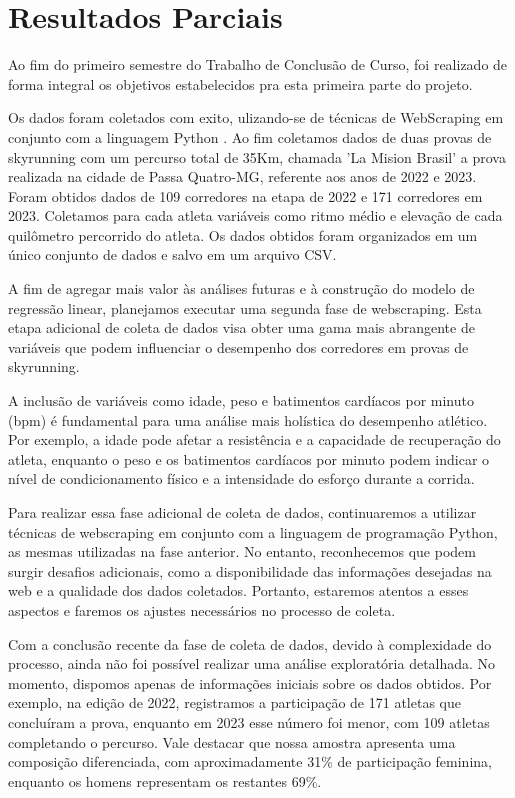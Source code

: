 \section{Resultados Parciais}

Ao fim do primeiro semestre do Trabalho de Conclusão de Curso, foi realizado de forma integral os objetivos estabelecidos pra esta primeira parte do projeto.

Os dados foram coletados com exito, ulizando-se de técnicas de WebScraping em conjunto com a linguagem Python \cite{mitchell2019}. Ao fim coletamos dados de duas provas de skyrunning com um percurso total de 35Km, chamada 'La Mision Brasil' a prova realizada na cidade de Passa Quatro-MG, referente aos anos de 2022 e 2023. Foram obtidos dados de 109 corredores na etapa de 2022 e 171 corredores em 2023. Coletamos para cada atleta variáveis como ritmo médio e elevação de cada quilômetro percorrido do atleta.
Os dados obtidos foram organizados em um único conjunto de dados e salvo em um arquivo CSV. 

A fim de agregar mais valor às análises futuras e à construção do modelo de regressão linear, planejamos executar uma segunda fase de webscraping. Esta etapa adicional de coleta de dados visa obter uma gama mais abrangente de variáveis que podem influenciar o desempenho dos corredores em provas de skyrunning.

A inclusão de variáveis como idade, peso e batimentos cardíacos por minuto (bpm) é fundamental para uma análise mais holística do desempenho atlético. Por exemplo, a idade pode afetar a resistência e a capacidade de recuperação do atleta, enquanto o peso e os batimentos cardíacos por minuto podem indicar o nível de condicionamento físico e a intensidade do esforço durante a corrida.

Para realizar essa fase adicional de coleta de dados, continuaremos a utilizar técnicas de webscraping em conjunto com a linguagem de programação Python, as mesmas utilizadas na fase anterior. No entanto, reconhecemos que podem surgir desafios adicionais, como a disponibilidade das informações desejadas na web e a qualidade dos dados coletados. Portanto, estaremos atentos a esses aspectos e faremos os ajustes necessários no processo de coleta.

Com a conclusão recente da fase de coleta de dados, devido à complexidade do processo, ainda não foi possível realizar uma análise exploratória detalhada. No momento, dispomos apenas de informações iniciais sobre os dados obtidos. Por exemplo, na edição de 2022, registramos a participação de 171 atletas que concluíram a prova, enquanto em 2023 esse número foi menor, com 109 atletas completando o percurso. Vale destacar que nossa amostra apresenta uma composição diferenciada, com aproximadamente 31\% de participação feminina, enquanto os homens representam os restantes 69\%.

